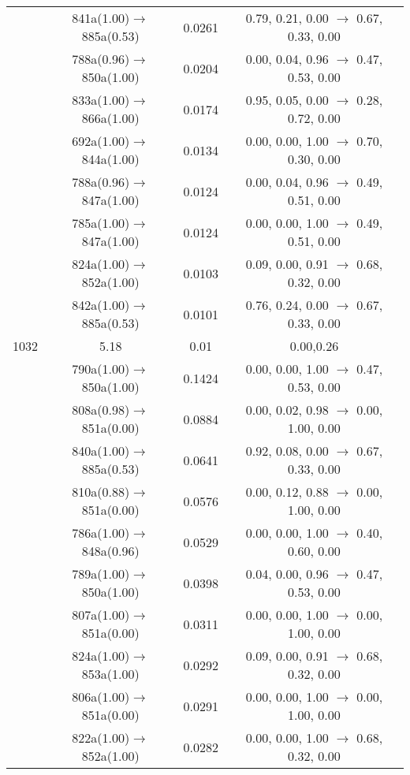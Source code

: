 \documentclass[10pt,a4paper]{article}
\begin{document}
\begin{longtable}{c|c|c|c}
 	& 841a(1.00)$\rightarrow$885a(0.53) &	 0.0261 &	 0.79, 0.21, 0.00 $\rightarrow$ 0.67, 0.33, 0.00 \\ 
 	& 788a(0.96)$\rightarrow$850a(1.00) &	 0.0204 &	 0.00, 0.04, 0.96 $\rightarrow$ 0.47, 0.53, 0.00 \\ 
 	& 833a(1.00)$\rightarrow$866a(1.00) &	 0.0174 &	 0.95, 0.05, 0.00 $\rightarrow$ 0.28, 0.72, 0.00 \\ 
 	& 692a(1.00)$\rightarrow$844a(1.00) &	 0.0134 &	 0.00, 0.00, 1.00 $\rightarrow$ 0.70, 0.30, 0.00 \\ 
 	& 788a(0.96)$\rightarrow$847a(1.00) &	 0.0124 &	 0.00, 0.04, 0.96 $\rightarrow$ 0.49, 0.51, 0.00 \\ 
 	& 785a(1.00)$\rightarrow$847a(1.00) &	 0.0124 &	 0.00, 0.00, 1.00 $\rightarrow$ 0.49, 0.51, 0.00 \\ 
 	& 824a(1.00)$\rightarrow$852a(1.00) &	 0.0103 &	 0.09, 0.00, 0.91 $\rightarrow$ 0.68, 0.32, 0.00 \\ 
 	& 842a(1.00)$\rightarrow$885a(0.53) &	 0.0101 &	 0.76, 0.24, 0.00 $\rightarrow$ 0.67, 0.33, 0.00 \\ 
 \hline1032 &	 5.18 &	 0.01 &	 0.00,0.26 \\ 
  	& 790a(1.00)$\rightarrow$850a(1.00) &	 0.1424 &	 0.00, 0.00, 1.00 $\rightarrow$ 0.47, 0.53, 0.00 \\ 
 	& 808a(0.98)$\rightarrow$851a(0.00) &	 0.0884 &	 0.00, 0.02, 0.98 $\rightarrow$ 0.00, 1.00, 0.00 \\ 
 	& 840a(1.00)$\rightarrow$885a(0.53) &	 0.0641 &	 0.92, 0.08, 0.00 $\rightarrow$ 0.67, 0.33, 0.00 \\ 
 	& 810a(0.88)$\rightarrow$851a(0.00) &	 0.0576 &	 0.00, 0.12, 0.88 $\rightarrow$ 0.00, 1.00, 0.00 \\ 
 	& 786a(1.00)$\rightarrow$848a(0.96) &	 0.0529 &	 0.00, 0.00, 1.00 $\rightarrow$ 0.40, 0.60, 0.00 \\ 
 	& 789a(1.00)$\rightarrow$850a(1.00) &	 0.0398 &	 0.04, 0.00, 0.96 $\rightarrow$ 0.47, 0.53, 0.00 \\ 
 	& 807a(1.00)$\rightarrow$851a(0.00) &	 0.0311 &	 0.00, 0.00, 1.00 $\rightarrow$ 0.00, 1.00, 0.00 \\ 
 	& 824a(1.00)$\rightarrow$853a(1.00) &	 0.0292 &	 0.09, 0.00, 0.91 $\rightarrow$ 0.68, 0.32, 0.00 \\ 
 	& 806a(1.00)$\rightarrow$851a(0.00) &	 0.0291 &	 0.00, 0.00, 1.00 $\rightarrow$ 0.00, 1.00, 0.00 \\ 
 	& 822a(1.00)$\rightarrow$852a(1.00) &	 0.0282 &	 0.00, 0.00, 1.00 $\rightarrow$ 0.68, 0.32, 0.00 \\ 

\end{longtable}
\end{document}
